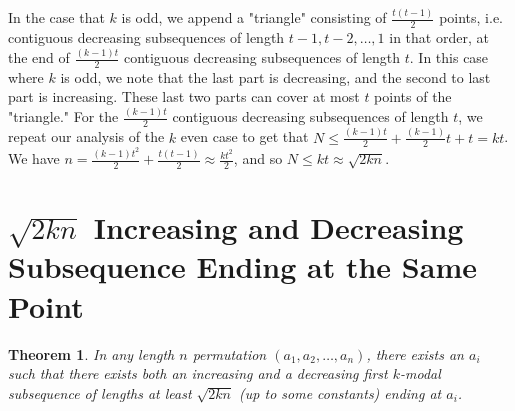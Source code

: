 \documentclass{article}
\newtheorem{theorem}{Theorem}
\begin{document}
In the case that $k$ is odd, we append a "triangle" consisting of $\frac{t(t-1)}{2}$ points, i.e. contiguous decreasing subsequences of length $t-1, t-2, \ldots, 1$ in that order, at the end of $\frac{(k-1)t}{2}$ contiguous decreasing subsequences of length $t$. In this case where $k$ is odd, we note that the last part is decreasing, and the second to last part is increasing. These last two parts can cover at most $t$ points of the "triangle." For the  $\frac{(k-1)t}{2}$ contiguous decreasing subsequences of length $t$, we repeat our analysis of the $k$ even case to get that $N \leq \frac{(k-1)t}{2} + \frac{(k-1)}{2}t + t = kt $. We have $n = \frac{(k-1)t^2}{2} + \frac{t(t-1)}{2} \approx \frac{kt^2}{2}$, and so $N \leq kt \approx \sqrt{2kn}$. \\

\section{$\sqrt{2kn}$ Increasing and Decreasing Subsequence Ending at the Same Point}
\begin{theorem}
In any length $n$ permutation $(a_1, a_2, \ldots, a_n)$, there exists an $a_i$ such that there exists both an increasing and a decreasing first $k$-modal subsequence of lengths at least $\sqrt{2kn}$ (up to some constants) ending at $a_i$. 
\end{theorem}
\end{document}
